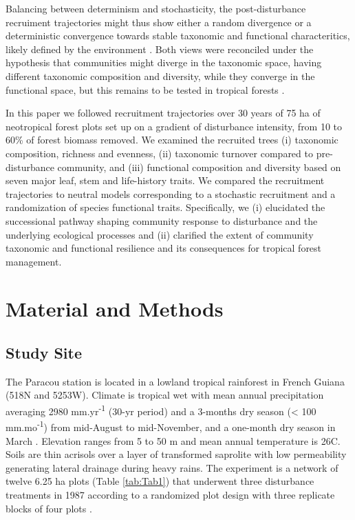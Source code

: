 \documentclass[fleqn,10pt]{ArtEcoFoG} %
\begin{document}
Balancing between determinism and stochasticity, the post-disturbance
recruiment trajectories might thus show either a random divergence or a
deterministic convergence towards stable taxonomic and functional
characteritics, likely defined by the environment
\citep{Clements1916, Diamond1975}. Both views were reconciled under the
hypothesis that communities might diverge in the taxonomic space, having
different taxonomic composition and diversity, while they converge in
the functional space, but this remains to be tested in tropical forests
\citep{Fukami2005, Li2018}.

In this paper we followed recruitment trajectories over 30 years of 75
ha of neotropical forest plots set up on a gradient of disturbance
intensity, from 10 to 60\% of forest biomass removed. We examined the
recruited trees (i) taxonomic composition, richness and evenness, (ii)
taxonomic turnover compared to pre-disturbance community, and (iii)
functional composition and diversity based on seven major leaf, stem and
life-history traits. We compared the recruitment trajectories to neutral
models corresponding to a stochastic recruitment and a randomization of
species functional traits. Specifically, we (i) elucidated the
successional pathway shaping community response to disturbance and the
underlying ecological processes and (ii) clarified the extent of
community taxonomic and functional resilience and its consequences for
tropical forest management.

\section{Material and Methods}\label{material-and-methods}

\subsection{Study Site}\label{study-site}

The Paracou station is located in a lowland tropical rainforest in
French Guiana (518\textdegree N and 5253\textdegree W). Climate is
tropical wet with mean annual precipitation averaging 2980
mm.yr\textsuperscript{-1} (30-yr period) and a 3-months dry season
(\textless{} 100 mm.mo\textsuperscript{-1}) from mid-August to
mid-November, and a one-month dry season in March \citep{Wagner2011}.
Elevation ranges from 5 to 50 m and mean annual temperature is
26\textdegree C. Soils are thin acrisols over a layer of transformed
saprolite with low permeability generating lateral drainage during heavy
rains. The experiment is a network of twelve 6.25 ha plots (Table
\ref{tab:Tab1}) that underwent three disturbance treatments in 1987
according to a randomized plot design with three replicate blocks of
four plots \citep{Herault2018}.
\end{document}
